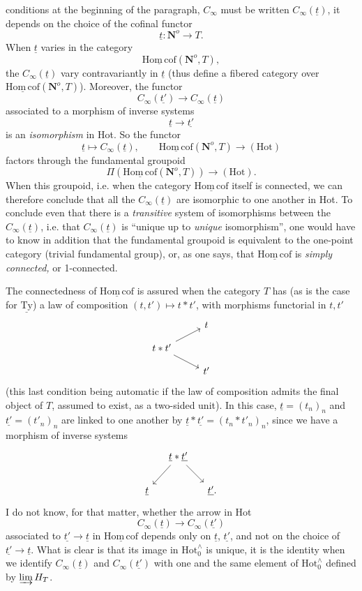 \documentclass[11pt]{article}
\newcommand{\printedpage}[1]{\marginpar{\footnotesize p.~#1}}
\newcommand{\msp}[1]{\marginpar{\footnotesize [#1]}}
\newcommand{\Hot}{\mathrm{Hot}}
\newcommand{\Hotz}{\mathrm{Hot}_0^{\wedge}}
\newcommand{\Hc}{\underline{\mathrm{Hom\,cof}}}
\newcommand{\Nop}{\mathbf{N}^o}
\begin{document}
\printedpage{74}
conditions at the beginning of the paragraph, $C_\infty$ must be written $C_\infty(\underline{t})$, it depends on the choice of the cofinal functor
\[
\underline{t} : \Nop \longrightarrow T.
\]
When $\underline{t}$ varies in the category
\[
\Hc(\Nop, T),
\]
the $C_\infty(\underline{t})$ vary contravariantly in $\underline{t}$ (thus define a fibered category over $\Hc(\Nop, T)$). Moreover, the functor
\[
C_\infty(\underline{t'}) \longrightarrow C_\infty(\underline{t})
\]
associated to a morphism of inverse systems
\[
\underline{t} \longrightarrow \underline{t'}
\]
is an \textit{isomorphism} in Hot. So the
\msp{page 118}
functor
\[
\underline{t} \longmapsto C_\infty(\underline{t}), \qquad \Hc(\Nop, T) \longrightarrow (\Hot)
\]
factors through the fundamental groupoid
\[
\Pi(\Hc(\Nop, T)) \longrightarrow (\Hot).
\]
When this groupoid, i.e. when the category $\Hc$ itself is connected, we can therefore conclude that all the $C_\infty(\underline{t})$ are isomorphic to one another in Hot. To conclude even that there is a \textit{transitive} system of isomorphisms between the $C_\infty(\underline{t})$, i.e. that $C_\infty(\underline{t})$ is ``unique up to \textit{unique} isomorphism'', one would have to know in addition that the fundamental groupoid is equivalent to the one-point category (trivial fundamental group), or, as one says, that $\Hc$ is \textit{simply connected,} or 1-connected.

The connectedness of $\Hc$ is assured when the category $T$ has (as is the case for $\underline{\mathrm{Ty}}$) a law of composition $(t,t') \longmapsto t * t'$, with morphisms functorial in $t, t'$
\[
\begin{tikzcd}[row sep=small]
 & t \\
t * t' \arrow[ru] \arrow[rd] & \\
 & t'
\end{tikzcd}
\]
(this last condition being automatic
\printedpage{75}
\msp{page 119}
if the law of composition admits the final object of $T$, assumed to exist, as a two-sided unit). In this case, $\underline{t} = (t_n)_n$ and $\underline{t'} = (t'_n)_n$ are linked to one another by $\underline{t} * \underline{t'} = (t_n * t'_n)_n$, since we have a morphism of inverse systems
\[
\begin{tikzcd}[column sep=small]
 & \underline{t} * \underline{t'} \arrow[ld] \arrow[rd] & \\
\underline{t} & & \underline{t'}.
\end{tikzcd}
\]
I do not know, for that matter, whether the arrow in Hot
\[
C_\infty(\underline{t}) \longrightarrow C_\infty(\underline{t'})
\]
associated to $\underline{t'} \longrightarrow \underline{t}$ in $\Hc$ depends only on $\underline{t}$, $\underline{t'}$, and not on the choice of $\underline{t'} \longrightarrow \underline{t}$. What is clear is that its image in $\Hotz$ is unique, it is the identity when we identify $C_\infty(\underline{t})$ and $C_\infty(\underline{t'})$ with one and the same element of $\Hotz$ defined by $\varinjlim H_T$.
\end{document}
